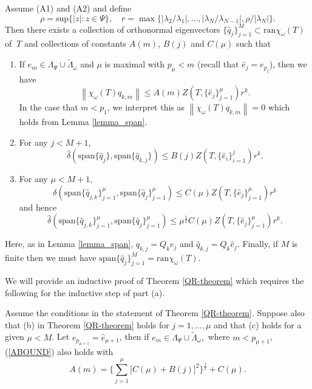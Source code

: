 \documentclass[a4paper,10pt]{article}
\begin{document}
\begin{theorem}\label{QR-theorem}
Assume (A1) and (A2) and define
$$
\rho=\mathrm{sup}\{\left|z\right|:z\in\Psi\},\quad r=\max\{\left|\lambda_2/\lambda_1\right|,...,\left|\lambda_N/\lambda_{N-1}\right|,\rho/\left|\lambda_N\right|\}.
$$
Then there exists a collection of orthonormal eigenvectors $\{\hat q_j\}_{j=1}^M\subset\mathrm{ran}\chi_{\omega}(T)$ of $\ T$ and collections of constants $A(m)$, $B(j)$ and $C(\mu)$ such that
\begin{enumerate}
	\item[(a)] If $e_m\in\Lambda_{\Psi}\cup\tilde \Lambda_{\omega}$ and $\mu$ is maximal with $p_\mu<m$ (recall that $\hat e_j=e_{p_j}$), then we have
	\begin{equation}
	\label{ABOUND}
	\left\|\chi_\omega(T)q_{k,m}\right\|\leq A(m) Z(T,\{\hat e_j\}_{j=1}^\mu)r^k.
	\end{equation}
	In the case that $m<p_1$, we interpret this as $\left\|\chi_\omega(T)q_{k,m}\right\|=0$ which holds from Lemma \ref{lemma_span}.
	\item[(b)] For any $j<M+1$,
	\begin{equation}
	\label{BBOUND}
	\hat\delta(\mathrm{span}\{\hat q_j\},\mathrm{span}\{\hat q_{k,j}\})\leq B(j)Z(T,\{\hat e_i\}_{i=1}^j) r^k.\end{equation}
	\item[(c)] For any $\mu<M+1$,
	\begin{equation}
	\label{CBOUND}
	\delta(\mathrm{span}\{\hat q_{j,k}\}_{j=1}^{\mu},\mathrm{span}\{\hat q_{j}\}_{j=1}^{\mu})\leq C(\mu)Z(T,\{\hat e_j\}_{j=1}^\mu) r^k
	\end{equation}
	and hence
	\begin{equation}
	\label{CBOUND2}
	\hat\delta(\mathrm{span}\{\hat q_{j,k}\}_{j=1}^{\mu},\mathrm{span}\{\hat q_{j}\}_{j=1}^{\mu})\leq \mu^{\frac{1}{2}}C(\mu)Z(T,\{\hat e_j\}_{j=1}^\mu) r^k.
	\end{equation}
\end{enumerate}
Here, as in Lemma \ref{lemma_span}, $q_{k,j} = Q_k  e_j$ and $\hat q_{k,j} = Q_k \hat e_j$. Finally, if $M$ is finite then we must have $\mathrm{span}\{\hat q_j\}_{j=1}^M = \mathrm{ran}\chi_{\omega}(T).$
\end{theorem}

We will provide an inductive proof of Theorem \ref{QR-theorem} which requires the following for the inductive step of part (a).

\begin{lemma}\label{noidea} Assume the conditions in the statement of Theorem \ref{QR-theorem}. Suppose also that (b) in Theorem \ref{QR-theorem} holds for $j=1,...,\mu$ and that (c) holds for a given $\mu<M$. Let $e_{p_{\mu+1}} = \hat  e_{\mu+1}$, then if $e_m \in
  \Lambda_{\Psi} \cup
  \tilde \Lambda_{\omega},$ where $m < p_{\mu+1}$, (\ref{ABOUND}) also holds with
	$$
	A(m)=\Big\{\sum_{j=1}^{\mu}\big[C(\mu)+B(j)\big]^2\Big\}^{\frac{1}{2}}+C(\mu).
	$$
\end{lemma}
\end{document}
